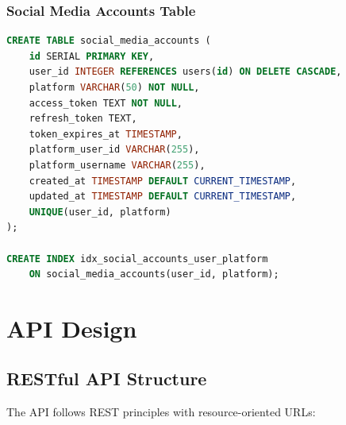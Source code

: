 \subsubsection{Social Media Accounts Table}

\begin{lstlisting}[language=SQL, caption=Social Media Accounts Table Schema]
CREATE TABLE social_media_accounts (
    id SERIAL PRIMARY KEY,
    user_id INTEGER REFERENCES users(id) ON DELETE CASCADE,
    platform VARCHAR(50) NOT NULL,
    access_token TEXT NOT NULL,
    refresh_token TEXT,
    token_expires_at TIMESTAMP,
    platform_user_id VARCHAR(255),
    platform_username VARCHAR(255),
    created_at TIMESTAMP DEFAULT CURRENT_TIMESTAMP,
    updated_at TIMESTAMP DEFAULT CURRENT_TIMESTAMP,
    UNIQUE(user_id, platform)
);

CREATE INDEX idx_social_accounts_user_platform 
    ON social_media_accounts(user_id, platform);
\end{lstlisting}

\section{API Design}

\subsection{RESTful API Structure}

The API follows REST principles with resource-oriented URLs:

